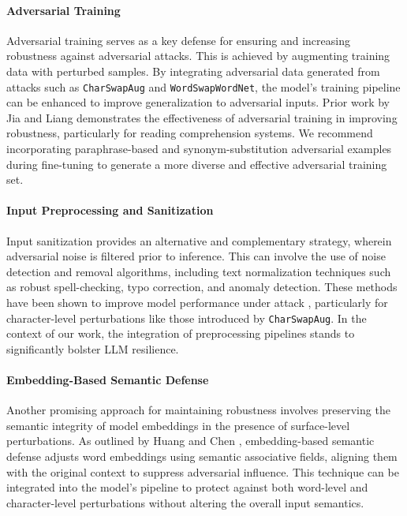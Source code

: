 \documentclass[conference]{IEEEtran}
\begin{document}
\paragraph{Adversarial Training}
Adversarial training serves as a key defense for ensuring and increasing robustness against adversarial attacks. This is achieved by augmenting training data with perturbed samples. By integrating adversarial data generated from attacks such as \texttt{CharSwapAug} and \texttt{WordSwapWordNet}, the model’s training pipeline can be enhanced to improve generalization to adversarial inputs. Prior work by Jia and Liang \cite{jia2017adversarial} demonstrates the effectiveness of adversarial training in improving robustness, particularly for reading comprehension systems. We recommend incorporating paraphrase-based and synonym-substitution adversarial examples during fine-tuning to generate a more diverse and effective adversarial training set.

\paragraph{Input Preprocessing and Sanitization}
Input sanitization provides an alternative and complementary strategy, wherein adversarial noise is filtered prior to inference. This can involve the use of noise detection and removal algorithms, including text normalization techniques such as robust spell-checking, typo correction, and anomaly detection. These methods have been shown to improve model performance under attack \cite{omar2022robust}, particularly for character-level perturbations like those introduced by \texttt{CharSwapAug}. In the context of our work, the integration of preprocessing pipelines stands to significantly bolster LLM resilience.

\paragraph{Embedding-Based Semantic Defense}
Another promising approach for maintaining robustness involves preserving the semantic integrity of model embeddings in the presence of surface-level perturbations. As outlined by Huang and Chen \cite{huang2024semantic}, embedding-based semantic defense adjusts word embeddings using semantic associative fields, aligning them with the original context to suppress adversarial influence. This technique can be integrated into the model’s pipeline to protect against both word-level and character-level perturbations without altering the overall input semantics.
\end{document}
